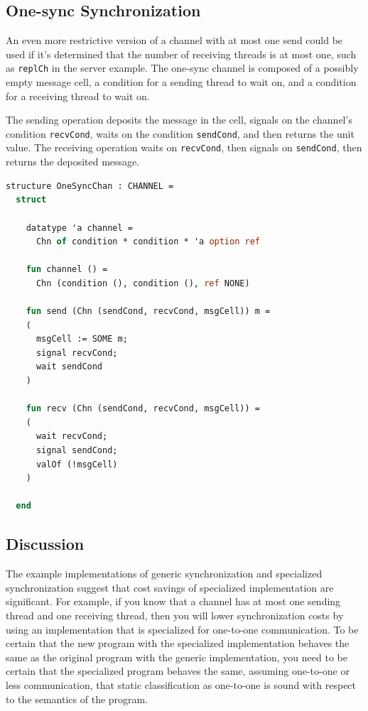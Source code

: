 \documentclass[letterpaper, 11pt]{extarticle}
\begin{document}
\subsection{One-sync Synchronization}

An even more restrictive version of a channel with at most one send could be used if it's
determined that the number of receiving threads is at most one,
such as \lstinline{replCh} in the server example.
The one-sync channel is
composed of a possibly empty message cell, a condition for a sending thread to wait on,
and a condition for a receiving thread to wait on.

The sending operation deposits the message in the cell, signals on the channel's condition \lstinline{recvCond},
waits on the condition \lstinline{sendCond}, and then returns the unit value.
The receiving operation waits on \lstinline{recvCond},
then signals on \lstinline{sendCond}, then returns the deposited message.

\begin{lstlisting}[language=ML, mathescape]
  structure OneSyncChan : CHANNEL =
  struct

    datatype 'a channel =
      Chn of condition * condition * 'a option ref

    fun channel () =
      Chn (condition (), condition (), ref NONE)

    fun send (Chn (sendCond, recvCond, msgCell)) m =
    (
      msgCell := SOME m;
      signal recvCond;  
      wait sendCond
    )

    fun recv (Chn (sendCond, recvCond, msgCell)) =
    (
      wait recvCond;
      signal sendCond;
      valOf (!msgCell)
    )

  end
\end{lstlisting}

\subsection{Discussion}
The example implementations of generic synchronization and specialized synchronization suggest
that cost savings of specialized implementation are significant. For example, if you know that
a channel has at most one sending thread and one receiving thread, then you will
lower synchronization costs by
using an implementation that is specialized for one-to-one communication.  To be certain that
the new program with the specialized implementation behaves the same as the original program
with the generic implementation, you need to be certain that the
specialized program behaves the same, assuming one-to-one or less communication, that
static classification as one-to-one is sound with respect to the semantics of the program.  
\end{document}
